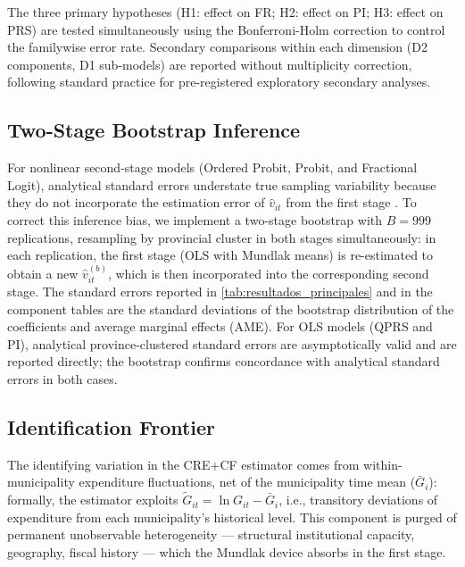 The three primary hypotheses (H1: effect on FR; H2: effect on PI; H3: effect on PRS) are tested simultaneously using the Bonferroni-Holm correction to control the familywise error rate.
Secondary comparisons within each dimension (D2 components, D1 sub-models) are reported without multiplicity correction, following standard practice for pre-registered exploratory secondary analyses.

\subsection{Two-Stage Bootstrap Inference}
\label{sec:bootstrap}

For nonlinear second-stage models (Ordered Probit, Probit, and Fractional Logit), analytical standard errors understate true sampling variability because they do not incorporate the estimation error of $\hat{v}_{it}$ from the first stage \citep{Wooldridge2015}.
To correct this inference bias, we implement a two-stage bootstrap with $B = 999$ replications, resampling by provincial cluster in both stages simultaneously: in each replication, the first stage (OLS with Mundlak means) is re-estimated to obtain a new $\hat{v}_{it}^{(b)}$, which is then incorporated into the corresponding second stage.
The standard errors reported in \cref{tab:resultados_principales} and in the component tables are the standard deviations of the bootstrap distribution of the coefficients and average marginal effects (AME).
For OLS models (QPRS and PI), analytical province-clustered standard errors are asymptotically valid \citep{Wooldridge2015} and are reported directly; the bootstrap confirms concordance with analytical standard errors in both cases.

\subsection{Identification Frontier}
\label{sec:frontera}

The identifying variation in the CRE+CF estimator comes from within-municipality expenditure fluctuations, net of the municipality time mean ($\bar{G}_{i}$): formally, the estimator exploits $\tilde{G}_{it} = \ln G_{it} - \bar{G}_{i}$, i.e., transitory deviations of expenditure from each municipality's historical level.
This component is purged of permanent unobservable heterogeneity --- structural institutional capacity, geography, fiscal history --- which the Mundlak device absorbs in the first stage.

